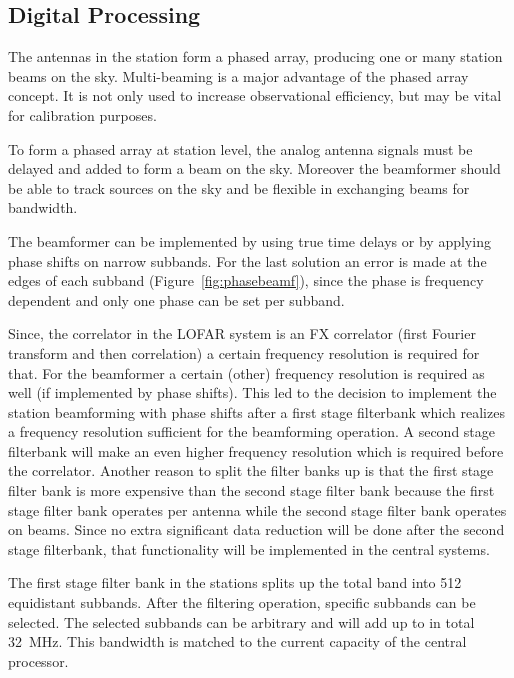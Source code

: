\documentclass[journal]{IEEEtran}
\begin{document}

\subsection{Digital Processing}

The antennas in the station form a phased array, producing one or many station beams on the sky. Multi-beaming is a major advantage of the phased array concept. It is not only used to increase observational efficiency, but may be vital for calibration purposes. 

To form a phased array at station level, the analog antenna signals must be delayed and added to form a beam on the sky. Moreover the beamformer should be able to track sources on the sky and be flexible in exchanging beams for bandwidth. 

The beamformer can be implemented by using true time delays or by applying phase shifts on narrow subbands. For the last solution an error is made at the edges of each subband (Figure~\ref{fig:phasebeamf}), since the phase is frequency dependent and only one phase can be set per subband. 


Since, the correlator in the LOFAR system is an FX correlator (first Fourier transform and then correlation) a certain frequency resolution is required for that. For the beamformer a certain (other) frequency resolution is required as well (if implemented by phase shifts). This led to the decision to implement the station beamforming with phase shifts after a first stage filterbank which realizes a frequency resolution sufficient for the beamforming operation. A second stage filterbank will make an even higher frequency resolution which is required before the correlator. Another reason to split the filter banks up is that the first stage filter bank is more expensive than the second stage filter bank because the first stage filter bank operates per antenna while the second stage filter bank operates on beams. Since no extra significant data reduction will be done after the second stage filterbank, that functionality will be implemented in the central systems.

The first stage filter bank in the stations splits up the total band into 512 equidistant subbands. After the filtering operation, specific subbands can be selected. The selected subbands can be arbitrary and will add up to in total 32~MHz. This bandwidth is matched to the current capacity of the central processor.
\end{document}
